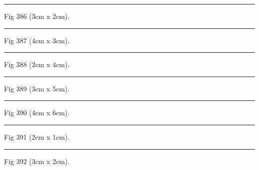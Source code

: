 \documentclass[a4paper,11pt]{article}
\begin{document}
\begin{swarmwrap}%
  \begin{minipage}[t]{3cm}
    \centering
    \rule{\linewidth}{2cm}
    {\footnotesize Fig 386 (3cm x 2cm).}
  \end{minipage}%
\end{swarmwrap}%
\swarmwrapnext
\lipsum[86]%

\begin{swarmwrap}%
  \begin{minipage}[t]{4cm}
    \centering
    \rule{\linewidth}{3cm}
    {\footnotesize Fig 387 (4cm x 3cm).}
  \end{minipage}%
\end{swarmwrap}%
\swarmwrapnext
\lipsum[87]%

\begin{swarmwrap}%
  \begin{minipage}[t]{2cm}
    \centering
    \rule{\linewidth}{4cm}
    {\footnotesize Fig 388 (2cm x 4cm).}
  \end{minipage}%
\end{swarmwrap}%
\swarmwrapnext
\lipsum[88]%

\begin{swarmwrap}%
  \begin{minipage}[t]{3cm}
    \centering
    \rule{\linewidth}{5cm}
    {\footnotesize Fig 389 (3cm x 5cm).}
  \end{minipage}%
\end{swarmwrap}%
\swarmwrapnext
\lipsum[89]%

\begin{swarmwrap}%
  \begin{minipage}[t]{4cm}
    \centering
    \rule{\linewidth}{6cm}
    {\footnotesize Fig 390 (4cm x 6cm).}
  \end{minipage}%
\end{swarmwrap}%
\swarmwrapnext
\lipsum[90]%

\begin{swarmwrap}%
  \begin{minipage}[t]{2cm}
    \centering
    \rule{\linewidth}{1cm}
    {\footnotesize Fig 391 (2cm x 1cm).}
  \end{minipage}%
\end{swarmwrap}%
\swarmwrapnext
\lipsum[91]%

\begin{swarmwrap}%
  \begin{minipage}[t]{3cm}
    \centering
    \rule{\linewidth}{2cm}
    {\footnotesize Fig 392 (3cm x 2cm).}
  \end{minipage}%
\end{swarmwrap}%
\swarmwrapnext
\lipsum[92]%
\end{document}
